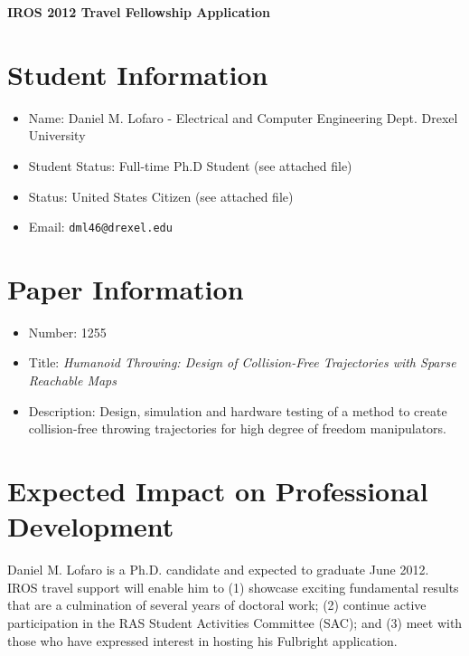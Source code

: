 \documentclass[11pt,a4paper,oneside]{report}
\begin{document}
\begin{center}
\LARGE{ \bf IROS 2012 Travel Fellowship Application }
\end{center}

\section*{Student Information}
\begin{itemize}
\item Name: Daniel M. Lofaro - Electrical and Computer Engineering Dept. Drexel University
\item Student Status: Full-time Ph.D Student (see attached file)
\item Status: United States Citizen (see attached file)
\item Email: \tt{dml46@drexel.edu}
\end{itemize}


\section*{Paper Information}
\begin{itemize}
\item Number: 1255
\item Title: \textit{Humanoid Throwing: Design of Collision-Free Trajectories with Sparse Reachable Maps}
\item Description: Design, simulation and hardware testing of a method to create collision-free throwing trajectories for high degree of freedom manipulators. 
\end{itemize}


\section*{Expected Impact on Professional Development}

Daniel M. Lofaro is a Ph.D. candidate and expected to graduate June 2012.  IROS travel support will enable him to (1) showcase exciting fundamental results that are a culmination of several years of doctoral work; (2) continue active participation in the RAS Student Activities Committee (SAC); and (3) meet with those who have expressed interest in hosting his Fulbright application.
\end{document}

